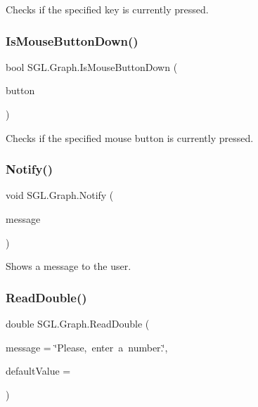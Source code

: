 Checks if the specified key is currently pressed. 

\mbox{\label{class_s_g_l_1_1_graph_a274ab575056c833cd3f3f45770c20b58}} 
\subsubsection{\texorpdfstring{Is\+Mouse\+Button\+Down()}{IsMouseButtonDown()}}
{\footnotesize\ttfamily bool S\+G\+L.\+Graph.\+Is\+Mouse\+Button\+Down (\begin{DoxyParamCaption}\item[{Mouse\+Button}]{button }\end{DoxyParamCaption})\hspace{0.3cm}{\ttfamily [inline]}}



Checks if the specified mouse button is currently pressed. 

\mbox{\label{class_s_g_l_1_1_graph_a16bfdc1d809835f73bd9870af125b161}} 
\subsubsection{\texorpdfstring{Notify()}{Notify()}}
{\footnotesize\ttfamily void S\+G\+L.\+Graph.\+Notify (\begin{DoxyParamCaption}\item[{string}]{message }\end{DoxyParamCaption})\hspace{0.3cm}{\ttfamily [inline]}}



Shows a message to the user. 

\mbox{\label{class_s_g_l_1_1_graph_ab84327403a05e999998f54b1bc4d1c35}} 
\subsubsection{\texorpdfstring{Read\+Double()}{ReadDouble()}}
{\footnotesize\ttfamily double S\+G\+L.\+Graph.\+Read\+Double (\begin{DoxyParamCaption}\item[{string}]{message = {\ttfamily \char`\"{}Please,~enter~a~number.\char`\"{}},  }\item[{double}]{default\+Value = {} }\end{DoxyParamCaption})\hspace{0.3cm}{\ttfamily [inline]}}



